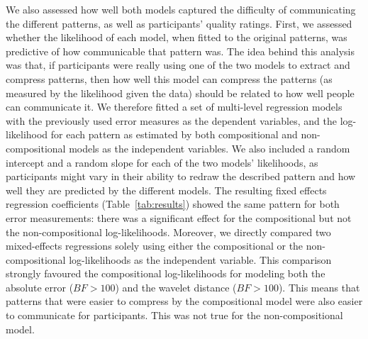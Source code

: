 \documentclass[a4paper,man, floatsintext, natbib]{apa6}
\begin{document}
We also assessed how well both models captured the difficulty of communicating the different patterns, as well as participants' quality ratings. First, we assessed whether the likelihood of each model, when fitted to the original patterns, was predictive of how communicable that pattern was. The idea behind this analysis was that, if participants were really using one of the two models to extract and compress patterns, then how well this model can compress the patterns (as measured by the likelihood given the data) should be related to how well people can communicate it. We therefore fitted a set of multi-level regression models with the previously used error measures as the dependent variables, and the log-likelihood for each pattern as estimated by both compositional and non-compositional models as the independent variables. We also included a random intercept and a random slope for each of the two models' likelihoods, as participants might vary in their ability to redraw the described pattern and how well they are predicted by the different models. The resulting fixed effects regression coefficients (Table~\ref{tab:results}) showed the same pattern for both error measurements: there was a significant effect for the compositional but not the non-compositional log-likelihoods. Moreover, we directly compared two mixed-effects regressions solely using either the compositional or the non-compositional log-likelihoods as the independent variable. This comparison strongly favoured the compositional log-likelihoods for modeling both the absolute error ($BF>100$) and the wavelet distance ($BF>100$). This means that patterns that were easier to compress by the compositional model were also easier to communicate for participants. This was not true for the non-compositional model.
\end{document}
